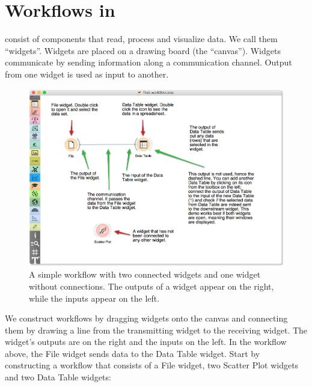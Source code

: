 \chapter{Workflows in \mutation}
\label{ch:workflows}

 consist of components that read, process and visualize data. We call them “widgets”. Widgets are placed on a drawing board (the “canvas”). Widgets communicate by sending information along a communication channel. Output from one widget is used as input to another.

\begin{figure}[h]
  \includegraphics[width=\linewidth]{graphics/ch-workflows/workflow-fig1.png}%
  \caption{A simple workflow with two connected widgets and one widget without connections. The outputs of a widget appear on the right, while the inputs appear on the left.}
  \label{fig:workflow-fig1}
\end{figure}

We construct workflows by dragging widgets onto the canvas and connecting them by drawing a line from the transmitting widget to the receiving widget. The widget’s outputs are on the right and the inputs on the left. In the workflow above, the File widget sends data to the Data Table widget.
\newpage
Start by constructing a workflow that consists of a File widget, two Scatter Plot widgets and two Data Table widgets:

